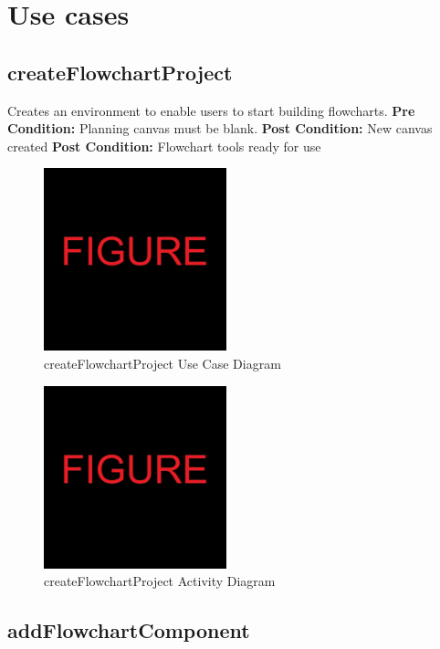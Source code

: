 \documentclass[11pt,a4paper,titlepage]{article}
\begin{document}
\newpage
\section{Use cases}

\subsection{createFlowchartProject}
Creates an environment to enable users to start building flowcharts.\newline\newline
\textbf{Pre Condition:} Planning canvas must be blank.\newline\newline
\textbf{Post Condition:} New canvas created\newline
\textbf{Post Condition:} Flowchart tools ready for use\newline

\begin{figure}[H]
  \centering
\includegraphics[width=200px]{figure.jpg}
\caption{createFlowchartProject Use Case Diagram}
\end{figure}

\begin{figure}[H]
  \centering
\includegraphics[width=200px]{figure.jpg}
\caption{createFlowchartProject Activity Diagram}
\end{figure}

\newpage
\subsection{addFlowchartComponent}
\end{document}
